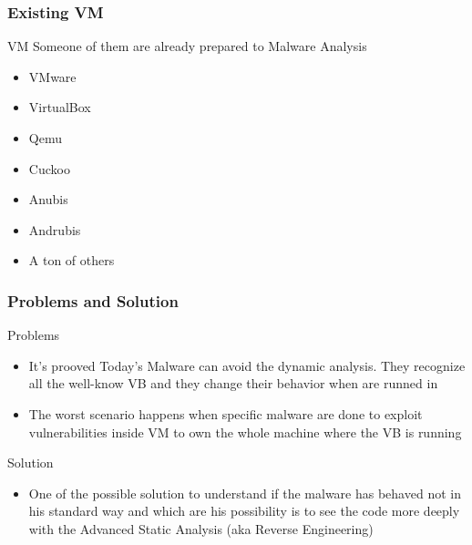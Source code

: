 \documentclass[]{beamer}
\begin{document}
		\begin{frame}
			\frametitle{Existing VM}
			\begin{block}{VM}
				Someone of them are already prepared to Malware Analysis	
				\begin{itemize}
					\item{VMware}
					\item{VirtualBox}
					\item{Qemu}
					\item{Cuckoo}
					\item{Anubis}
					\item{Andrubis}
					\item{A ton of others}
				\end{itemize}
			\end{block}
		\end{frame}
		\begin{frame}
			\frametitle{Problems and Solution}
			\begin{block}{Problems}
				\begin{itemize}
					\item{It's prooved Today's Malware can avoid the dynamic analysis. They recognize all the well-know VB and they change their behavior when are runned in }
					\item{The worst scenario happens when specific malware are done to exploit vulnerabilities inside VM to own the whole machine where the VB is running}
				\end{itemize}
			\end{block}
			\begin{block}{Solution}
				\begin{itemize}
					\item{One of the possible solution to understand if the malware has behaved not in his standard way and which are his possibility is to see the code more deeply with the Advanced Static Analysis (aka Reverse Engineering) }
				\end{itemize}
			\end{block}
		\end{frame}
\end{document}
